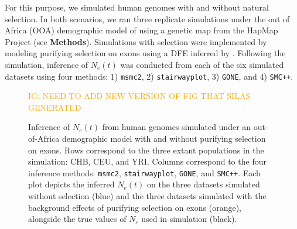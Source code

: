 \documentclass[hidelinks]{article}
\newcommand{\msmc}{\texttt{msmc2}\xspace}
\newcommand{\stairway}{\texttt{stairwayplot}\xspace}
\newcommand{\gone}{\texttt{GONE}\xspace}
\newcommand{\smcpp}{\texttt{SMC++}\xspace}
\newcommand{\igcomment}[1]{\textcolor{orange}{IG: #1}}
\begin{document}
    For this purpose, we simulated human genomes with and without natural selection.
    In both scenarios, we ran three replicate simulations
    under the out of Africa (OOA) demographic model of
    \citep{ragsdale2019models} using a genetic map from the HapMap Project \citep{international2007second} (see \textbf{Methods}).
    Simulations with selection were implemented by modeling purifying selection on exons
    using a DFE inferred by \cite{kim2017inference}.
    Following the simulation, inference of $N_e(t)$ was conducted from each of the six simulated datasets using four methods: 1) \msmc \citep{Schiffels2020}, 
    2) \stairway \citep{liu2020stairway}, 3) \gone \citep{santiago2020recent}, and 4) \smcpp \citep{terhorst2017robust}.
    
    \begin{figure}[b!]
        \centering
        \igcomment{NEED TO ADD NEW VERSION OF FIG THAT SILAS GENERATED}
        \caption{
        \label{fig:human-demography}
        Inference of $N_e(t)$ from human genomes simulated under an out-of-Africa demographic model \citep{ragsdale2019models}
        with and without purifying selection on exons. 
        Rows correspond to the three extant populations in the simulation: CHB, CEU, and YRI.
        Columns correspond to the four inference methods:    
        \msmc \citep{Schiffels2020}, \stairway \citep{liu2020stairway}, \gone \citep{santiago2020recent}, and \smcpp \citep{terhorst2017robust}.
        Each plot depicts the inferred $N_e(t)$ on the three datasets simulated without selection (blue)
        and the three datasets simulated with the background effects of purifying selection on exons (orange),
        alongside the true values of $N_e$ used in simulation (black).
        }
    \end{figure}
\end{document}
